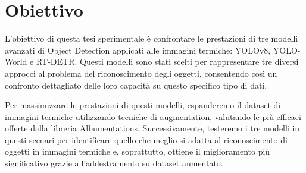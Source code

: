 \section{Obiettivo}
L'obiettivo di questa tesi sperimentale è confrontare le prestazioni di tre modelli avanzati di Object Detection applicati alle immagini termiche: YOLOv8, YOLO-World e RT-DETR. Questi modelli sono stati scelti per rappresentare tre diversi approcci al problema del riconoscimento degli oggetti, consentendo così un confronto dettagliato delle loro capacità su questo specifico tipo di dati.

Per massimizzare le prestazioni di questi modelli, espanderemo il dataset di immagini termiche utilizzando tecniche di augmentation, valutando le più efficaci offerte dalla libreria Albumentations. Successivamente, testeremo i tre modelli in questi scenari per identificare quello che meglio si adatta al riconoscimento di oggetti in immagini termiche e, soprattutto, ottiene il miglioramento più significativo grazie all'addestramento su dataset aumentato.

\newpage
